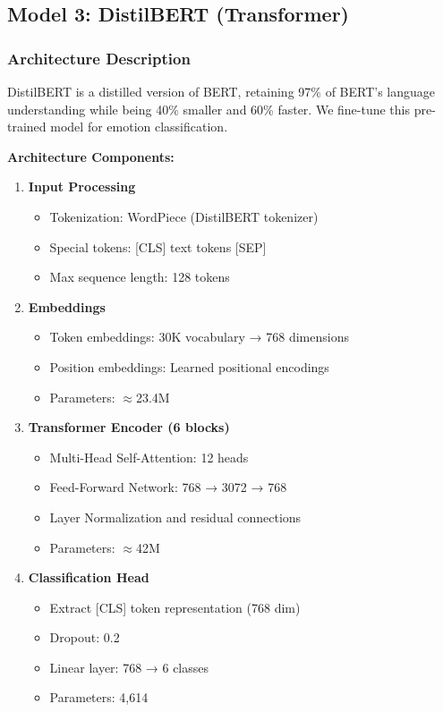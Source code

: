 \documentclass[12pt,a4paper]{article}
\begin{document}
\subsection{Model 3: DistilBERT (Transformer)}

\subsubsection{Architecture Description}
DistilBERT is a distilled version of BERT, retaining 97\% of BERT's language understanding while being 40\% smaller and 60\% faster. We fine-tune this pre-trained model for emotion classification.

\textbf{Architecture Components:}
\begin{enumerate}
    \item \textbf{Input Processing}
    \begin{itemize}
        \item Tokenization: WordPiece (DistilBERT tokenizer)
        \item Special tokens: [CLS] text tokens [SEP]
        \item Max sequence length: 128 tokens
    \end{itemize}
    
    \item \textbf{Embeddings}
    \begin{itemize}
        \item Token embeddings: 30K vocabulary → 768 dimensions
        \item Position embeddings: Learned positional encodings
        \item Parameters: $\approx$23.4M
    \end{itemize}
    
    \item \textbf{Transformer Encoder (6 blocks)}
    \begin{itemize}
        \item Multi-Head Self-Attention: 12 heads
        \item Feed-Forward Network: 768 → 3072 → 768
        \item Layer Normalization and residual connections
        \item Parameters: $\approx$42M
    \end{itemize}
    
    \item \textbf{Classification Head}
    \begin{itemize}
        \item Extract [CLS] token representation (768 dim)
        \item Dropout: 0.2
        \item Linear layer: 768 → 6 classes
        \item Parameters: 4,614
    \end{itemize}
\end{enumerate}
\end{document}
